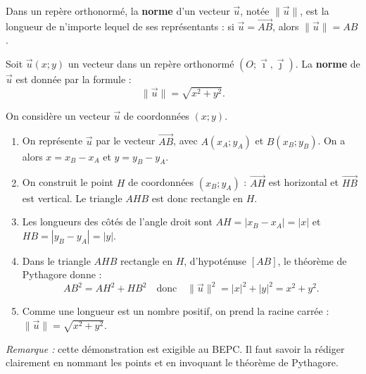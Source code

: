 \documentclass[11pt]{article}
\begin{document}
\begin{definition}
Dans un repère orthonormé, la \textbf{norme} d'un vecteur $\vec{u}$, notée $\|\vec{u}\|$, est la longueur de n'importe lequel de ses représentants : si $\vec{u} = \overrightarrow{AB}$, alors $\|\vec{u}\| = AB$.
\end{definition}

\begin{propriete}
Soit $\vec{u}(x ; y)$ un vecteur dans un repère orthonormé $(O ; \vec{\imath}, \vec{\jmath})$.
La \textbf{norme} de $\vec{u}$ est donnée par la formule :
\[
\|\vec{u}\| = \sqrt{x^2 + y^2}.
\]
\end{propriete}

\begin{experience}
On considère un vecteur $\vec{u}$ de coordonnées $(x ; y)$.
\begin{enumerate}
    \item On représente $\vec{u}$ par le vecteur $\overrightarrow{AB}$, avec $A(x_A ; y_A)$ et $B(x_B ; y_B)$. On a alors $x = x_B - x_A$ et $y = y_B - y_A$.
    \item On construit le point $H$ de coordonnées $(x_B ; y_A)$ : $\overrightarrow{AH}$ est horizontal et $\overrightarrow{HB}$ est vertical. Le triangle $AHB$ est donc rectangle en $H$.
    \item Les longueurs des côtés de l'angle droit sont $AH = |x_B - x_A| = |x|$ et $HB = |y_B - y_A| = |y|$.
    \item Dans le triangle $AHB$ rectangle en $H$, d'hypoténuse $[AB]$, le théorème de Pythagore donne :
    \[
    AB^2 = AH^2 + HB^2 \quad \text{donc} \quad \|\vec{u}\|^2 = |x|^2 + |y|^2 = x^2 + y^2.
    \]
    \item Comme une longueur est un nombre positif, on prend la racine carrée : $\|\vec{u}\| = \sqrt{x^2 + y^2}$.
\end{enumerate}
\emph{Remarque :} cette démonstration est exigible au BEPC. Il faut savoir la rédiger clairement en nommant les points et en invoquant le théorème de Pythagore.
\end{experience}
\end{document}
